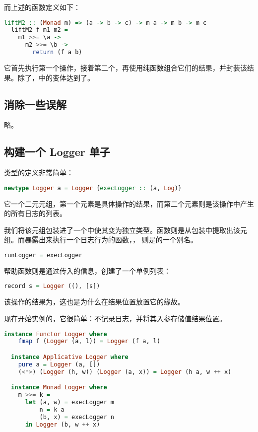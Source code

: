 \documentclass[./main.tex]{subfiles}
\begin{document}
而上述的函数定义如下：

\begin{lstlisting}[language=Haskell]
  liftM2 :: (Monad m) => (a -> b -> c) -> m a -> m b -> m c
  liftM2 f m1 m2 =
    m1 >>= \a ->
      m2 >>= \b ->
        return (f a b)
\end{lstlisting}

它首先执行第一个操作，接着第二个，再使用纯函数组合它们的结果，并封装该结果。除了，中的变体达到了。

\subsection*{消除一些误解}

略。

\subsection*{构建一个 Logger 单子}

类型的定义非常简单：

\begin{lstlisting}[language=Haskell]
  newtype Logger a = Logger {execLogger :: (a, Log)}
\end{lstlisting}

它一个二元元组，第一个元素是具体操作的结果，而第二个元素则是该操作中产生的所有日志的列表。

我们将该元组包装进了一个中使其变为独立类型。函数则是从包装中提取出该元组。而暴露出来执行一个日志行为的函数，，
则是的一个别名。

\begin{lstlisting}[language=Haskell]
  runLogger = execLogger
\end{lstlisting}

帮助函数则是通过传入的信息，创建了一个单例列表：

\begin{lstlisting}[language=Haskell]
  record s = Logger ((), [s])
\end{lstlisting}

该操作的结果为\acode{()}，这也是为什么在结果位置放置它的缘故。

现在开始实例的，它很简单：不记录日志，并将其入参存储值结果位置。

\begin{lstlisting}[language=Haskell]
  instance Functor Logger where
    fmap f (Logger (a, l)) = Logger (f a, l)

  instance Applicative Logger where
    pure a = Logger (a, [])
    (<*>) (Logger (h, w)) (Logger (a, x)) = Logger (h a, w ++ x)

  instance Monad Logger where
    m >>= k =
      let (a, w) = execLogger m
          n = k a
          (b, x) = execLogger n
      in Logger (b, w ++ x)
\end{lstlisting}
\end{document}
